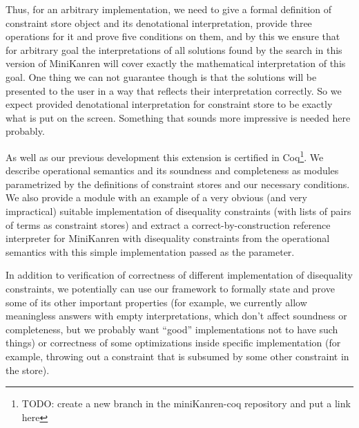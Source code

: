 \documentclass[submission,copyright,creativecommons]{eptcs}
\begin{document}
Thus, for an arbitrary implementation, we need to give a formal definition of constraint store object and its denotational interpretation, provide three
operations for it and prove five conditions on them, and by this we ensure that for arbitrary goal the interpretations of all solutions found by the
search in this version of MiniKanren will cover exactly the mathematical interpretation of this goal. One thing we can not guarantee though is that
the solutions will be presented to the user in a way that reflects their interpretation correctly. So we expect provided denotational interpretation
for constraint store to be exactly what is put on the screen. {\color{red} Something that sounds more impressive is needed here probably.}

As well as our previous development this extension is certified in Coq\footnote{\color{red} TODO: create a new branch in the miniKanren-coq repository
and put a link here}. We describe operational semantics and its soundness and completeness as modules parametrized by the definitions of constraint
stores and our necessary conditions. We also provide a module with an example of a very obvious (and very impractical) suitable implementation of
disequality constraints (with lists of pairs of terms as constraint stores) and extract a correct-by-construction reference interpreter for MiniKanren
with disequality constraints from the operational semantics with this simple implementation passed as the parameter.

In addition to verification of correctness of different implementation of disequality constraints, we potentially can use our framework to formally
state and prove some of its other important properties (for example, we currently allow meaningless answers with empty interpretations, which don't
affect soundness or completeness, but we probably want ``good'' implementations not to have such things) or correctness of some optimizations inside
specific implementation (for example, throwing out a constraint that is subsumed by some other constraint in the store).



\end{document}
